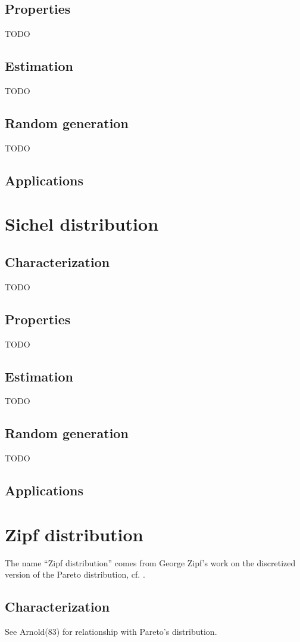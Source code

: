 \subsection{Properties}
TODO
\subsection{Estimation}
TODO
\subsection{Random generation}
TODO
\subsection{Applications}

\section{Sichel distribution}
\subsection{Characterization}
TODO
\subsection{Properties}
TODO
\subsection{Estimation}
TODO
\subsection{Random generation}
TODO
\subsection{Applications}



\section{Zipf distribution}
The name ``Zipf distribution'' comes from George Zipf's work on the discretized version of the Pareto distribution, cf. \cite{arnold83}.
\subsection{Characterization}
See Arnold(83) for relationship with Pareto's distribution.
